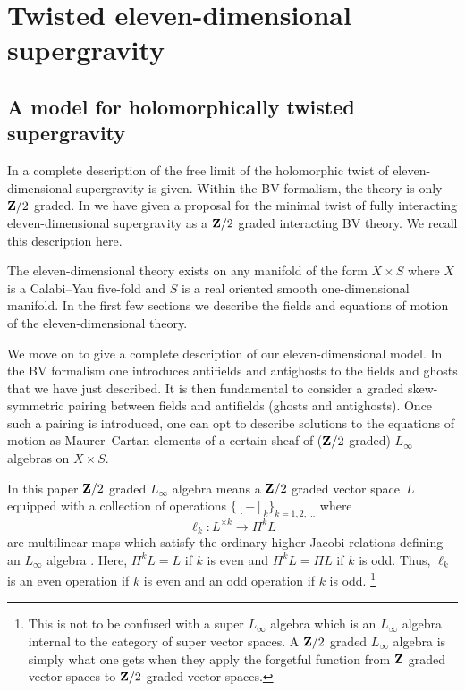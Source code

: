 


\section{Twisted eleven-dimensional supergravity}
%
\subsection{A model for holomorphically twisted supergravity}

In \cite{SWspinor} a complete description of the free limit of the holomorphic twist of eleven-dimensional supergravity is given.
Within the BV formalism, the theory is only $\mathbf{Z}/2$ graded.
In \cite{RSW} we have given a proposal for the minimal twist of fully interacting eleven-dimensional supergravity as a $\mathbf{Z}/2$ graded interacting BV theory.
We recall this description here.

The eleven-dimensional theory exists on any manifold of the form $X \times S$ where $X$ is a Calabi--Yau five-fold and $S$ is a real oriented smooth one-dimensional manifold.
In the first few sections we describe the fields and equations of motion of the eleven-dimensional theory. 

%

\parsec[s:sugrafields]



\parsec[s:Lsugra]

We move on to give a complete description of our eleven-dimensional model.
In the BV formalism one introduces antifields and antighosts to the fields and ghosts that we have just described.
It is then fundamental to consider a graded skew-symmetric pairing between fields and antifields (ghosts and antighosts). 
Once such a pairing is introduced, one can opt to describe solutions to the equations of motion as Maurer--Cartan elements of a certain sheaf of ($\mathbf{Z}/2$-graded) $L_\infty$ algebras on $X \times S$.

In this paper $\mathbf{Z}/2$ graded $L_\infty$ algebra means a $\mathbf{Z}/2$ graded vector space~$L$ equipped with a collection of operations $\{[-]_k\}_{k = 1,2,\ldots}$ where 
\[
\ell_k \colon L^{\times k} \to \Pi^k L 
\]
are multilinear maps which satisfy the ordinary higher Jacobi relations defining an $L_\infty$ algebra \cite{??}. 
Here, $\Pi^k L = L$ if $k$ is even and $\Pi^k L = \Pi L$ if $k$ is odd. 
Thus, $\ell_k$ is an even operation if $k$ is even and an odd operation if $k$ is odd. 
\footnote{This is not to be confused with a super $L_\infty$ algebra which is an $L_\infty$ algebra internal to the category of super vector spaces.
A $\mathbf{Z}/2$ graded $L_\infty$ algebra is simply what one gets when they apply the forgetful function from $\mathbf{Z}$ graded vector spaces to $\mathbf{Z}/2$ graded vector spaces.}

